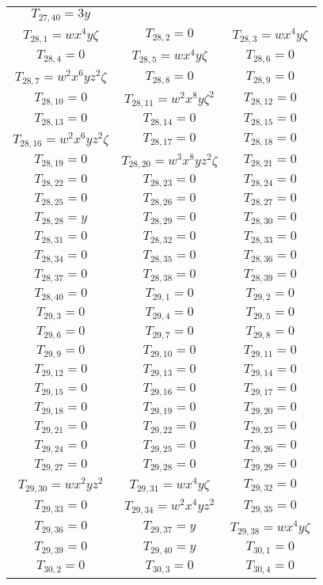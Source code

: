 \begin{longtable}{|c|c|c|}
$T_{27,40}= 3y$\\
$T_{28,1}= wx^4y\zeta$&
$T_{28,2}= 0$&
$T_{28,3}= wx^4y\zeta$\\
$T_{28,4}= 0$&
$T_{28,5}= wx^4y\zeta$&
$T_{28,6}= 0$\\
$T_{28,7}= w^2x^6yz^2\zeta$&
$T_{28,8}= 0$&
$T_{28,9}= 0$\\
$T_{28,10}= 0$&
$T_{28,11}= w^2x^8y\zeta^2$&
$T_{28,12}= 0$\\
$T_{28,13}= 0$&
$T_{28,14}= 0$&
$T_{28,15}= 0$\\
$T_{28,16}= w^2x^6yz^2\zeta$&
$T_{28,17}= 0$&
$T_{28,18}= 0$\\
$T_{28,19}= 0$&
$T_{28,20}= w^3x^8yz^2\zeta$&
$T_{28,21}= 0$\\
$T_{28,22}= 0$&
$T_{28,23}= 0$&
$T_{28,24}= 0$\\
$T_{28,25}= 0$&
$T_{28,26}= 0$&
$T_{28,27}= 0$\\
$T_{28,28}= y$&
$T_{28,29}= 0$&
$T_{28,30}= 0$\\
$T_{28,31}= 0$&
$T_{28,32}= 0$&
$T_{28,33}= 0$\\
$T_{28,34}= 0$&
$T_{28,35}= 0$&
$T_{28,36}= 0$\\
$T_{28,37}= 0$&
$T_{28,38}= 0$&
$T_{28,39}= 0$\\
$T_{28,40}= 0$&
$T_{29,1}= 0$&
$T_{29,2}= 0$\\
$T_{29,3}= 0$&
$T_{29,4}= 0$&
$T_{29,5}= 0$\\
$T_{29,6}= 0$&
$T_{29,7}= 0$&
$T_{29,8}= 0$\\
$T_{29,9}= 0$&
$T_{29,10}= 0$&
$T_{29,11}= 0$\\
$T_{29,12}= 0$&
$T_{29,13}= 0$&
$T_{29,14}= 0$\\
$T_{29,15}= 0$&
$T_{29,16}= 0$&
$T_{29,17}= 0$\\
$T_{29,18}= 0$&
$T_{29,19}= 0$&
$T_{29,20}= 0$\\
$T_{29,21}= 0$&
$T_{29,22}= 0$&
$T_{29,23}= 0$\\
$T_{29,24}= 0$&
$T_{29,25}= 0$&
$T_{29,26}= 0$\\
$T_{29,27}= 0$&
$T_{29,28}= 0$&
$T_{29,29}= 0$\\
$T_{29,30}= wx^2yz^2$&
$T_{29,31}= wx^4y\zeta$&
$T_{29,32}= 0$\\
$T_{29,33}= 0$&
$T_{29,34}= w^2x^4yz^2$&
$T_{29,35}= 0$\\
$T_{29,36}= 0$&
$T_{29,37}= y$&
$T_{29,38}= wx^4y\zeta$\\
$T_{29,39}= 0$&
$T_{29,40}= y$&
$T_{30,1}= 0$\\
$T_{30,2}= 0$&
$T_{30,3}= 0$&
$T_{30,4}= 0$\\

\end{longtable}
